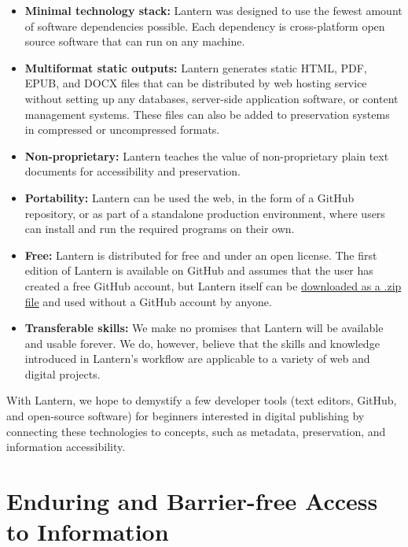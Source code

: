 \documentclass[
  11pt,
  openany]{book}
\begin{document}
\begin{itemize}
\item
  \textbf{Minimal technology stack:} Lantern was designed to use the fewest
  amount of software dependencies possible. Each dependency is cross-platform
  open source software that can run on any machine.
\item
  \textbf{Multiformat static outputs:} Lantern generates static HTML, PDF,
  EPUB, and DOCX files that can be distributed by web hosting service without
  setting up any databases, server-side application software, or content
  management systems. These files can also be added to preservation systems in
  compressed or uncompressed formats.
\item
  \textbf{Non-proprietary:} Lantern teaches the value of non-proprietary plain
  text documents for accessibility and preservation.
\item
  \textbf{Portability:} Lantern can be used the web, in the form of a GitHub
  repository, or as part of a standalone production environment, where users
  can install and run the required programs on their own.
\item
  \textbf{Free:} Lantern is distributed for free and under an open license.
  The first edition of Lantern is available on GitHub and assumes that the
  user has created a free GitHub account, but Lantern itself can be
  \href{https://github.com/nulib-oer/lantern/archive/refs/heads/main.zip}{downloaded
  as a .zip file} and used without a GitHub account by anyone.
\item
  \textbf{Transferable skills:} We make no promises that Lantern will be
  available and usable forever. We do, however, believe that the skills and
  knowledge introduced in Lantern's workflow are applicable to a variety of
  web and digital projects.
\end{itemize}

With Lantern, we hope to demystify a few developer tools (text editors,
GitHub, and open-source software) for beginners interested in digital
publishing by connecting these technologies to concepts, such as metadata,
preservation, and information accessibility.

\hypertarget{enduring-and-barrier-free-access-to-information}{%
\section{Enduring and Barrier-free Access to
Information}\label{enduring-and-barrier-free-access-to-information}}
\end{document}
